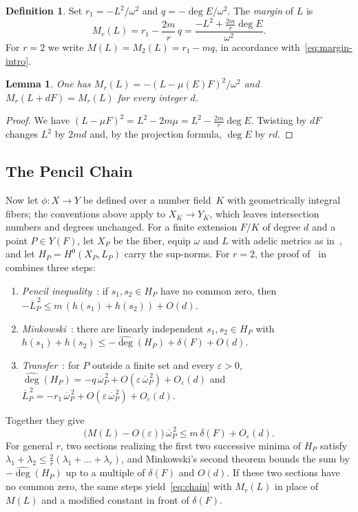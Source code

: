 \documentclass[11pt]{article}
\newtheorem{lemma}[theorem]{Lemma}
\theoremstyle{definition}
\newtheorem{definition}[theorem]{Definition}
\theoremstyle{remark}
\newcommand{\ob}{\overline{\omega}}
\newcommand{\Lb}{\overline{L}}
\newcommand{\degh}{\widehat{\deg}}
\begin{document}
\begin{definition}\label{def:margin}
Set $r_1=-L^2/\omega^2$ and $q=-\deg E/\omega^2$. The \emph{margin} of $L$ is
\[
M_r(L)=r_1-\frac{2m}{r}\,q=\frac{-L^2+\frac{2m}{r}\deg E}{\omega^2}.
\]
For $r=2$ we write $M(L)=M_2(L)=r_1-mq$, in accordance with~\eqref{eq:margin-intro}.
\end{definition}

\begin{lemma}\label{lem:square}
One has $M_r(L)=-(L-\mu(E)F)^2/\omega^2$ and $M_r(L+dF)=M_r(L)$ for every
integer $d$.
\end{lemma}

\begin{proof}
We have $(L-\mu F)^2=L^2-2m\mu=L^2-\frac{2m}{r}\deg E$. Twisting by $dF$ changes
$L^2$ by $2md$ and, by the projection formula, $\deg E$ by $rd$.
\end{proof}

\subsection{The Pencil Chain}\label{subsec:chain}
Now let $\phi\colon X\to Y$ be defined over a number field~$K$ with geometrically
integral fibers; the conventions above apply to $X_{\overline K}\to
Y_{\overline K}$, which leaves intersection numbers and degrees unchanged. For a
finite extension $F/K$ of degree $d$ and a point $P\in Y(F)$, let $X_P$ be the
fiber, equip $\omega$ and $L$ with adelic metrics as in~\cite[\S1.3]{So26}, and
let $H_P=H^0(X_P,L_P)$ carry the sup-norms. For $r=2$, the proof
of~\cite[Theorem~1]{So26} in~\cite[\S6.3]{So26} combines three steps:
\begin{enumerate}[label=(\roman*)]
\item \emph{Pencil inequality}~\cite[Prop.~3, (28), (29)]{So26}: if $s_1,s_2\in
H_P$ have no common zero, then $-\Lb_P^{\,2}\le m\,(h(s_1)+h(s_2))+O(d)$.
\item \emph{Minkowski}~\cite[(2), (30)]{So26}: there are linearly independent
$s_1,s_2\in H_P$ with $h(s_1)+h(s_2)\le-\degh(H_P)+\delta(F)+O(d)$.
\item \emph{Transfer}~\cite[(32), Cor.~1, (33), (35)]{So26}: for $P$ outside a
finite set and every $\varepsilon>0$,
$\degh(H_P)=-q\,\ob_P^{\,2}+O(\varepsilon\,\ob_P^{\,2})+O_\varepsilon(d)$ and
$\Lb_P^{\,2}=-r_1\,\ob_P^{\,2}+O(\varepsilon\,\ob_P^{\,2})+O_\varepsilon(d)$.
\end{enumerate}
Together they give
\begin{equation}\label{eq:chain}
\bigl(M(L)-O(\varepsilon)\bigr)\,\ob_P^{\,2}\le m\,\delta(F)+O_\varepsilon(d).
\end{equation}
For general $r$, two sections realizing the first two successive minima of $H_P$
satisfy $\lambda_1+\lambda_2\le\frac{2}{r}(\lambda_1+\dots+\lambda_r)$, and
Minkowski's second theorem bounds the sum by $-\degh(H_P)$ up to a multiple of
$\delta(F)$ and $O(d)$. If these two sections have no common zero, the same steps
yield~\eqref{eq:chain} with $M_r(L)$ in place of $M(L)$ and a modified constant
in front of $\delta(F)$.
\end{document}
